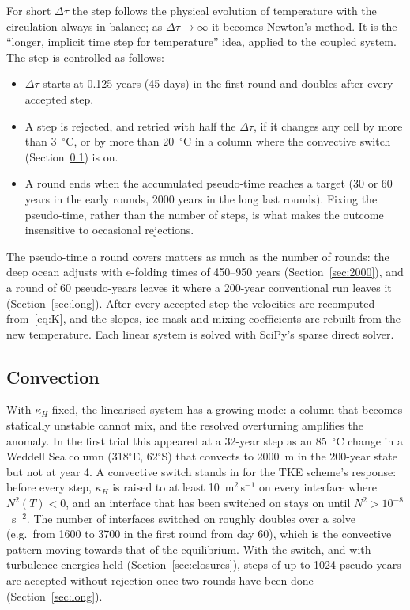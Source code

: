 \documentclass{article}
\begin{document}
For short $\Delta\tau$ the step follows the physical evolution of temperature with the circulation always in balance; as $\Delta\tau\to\infty$ it becomes Newton's method. It is the ``longer, implicit time step for temperature'' idea, applied to the coupled system. The step is controlled as follows:
\begin{itemize}
\item $\Delta\tau$ starts at 0.125 years (45 days) in the first round and doubles after every accepted step.
\item A step is rejected, and retried with half the $\Delta\tau$, if it changes any cell by more than 3~$^\circ$C, or by more than 20~$^\circ$C in a column where the convective switch (Section~\ref{sec:convection}) is on.
\item A round ends when the accumulated pseudo-time reaches a target (30 or 60 years in the early rounds, 2000 years in the long last rounds). Fixing the pseudo-time, rather than the number of steps, is what makes the outcome insensitive to occasional rejections.
\end{itemize}
The pseudo-time a round covers matters as much as the number of rounds: the deep ocean adjusts with e-folding times of 450--950 years (Section~\ref{sec:2000}), and a round of 60 pseudo-years leaves it where a 200-year conventional run leaves it (Section~\ref{sec:long}).
After every accepted step the velocities are recomputed from~\eqref{eq:K}, and the slopes, ice mask and mixing coefficients are rebuilt from the new temperature. Each linear system is solved with SciPy's sparse direct solver.

\subsection{Convection}\label{sec:convection}

With $\kappa_H$ fixed, the linearised system has a growing mode: a column that becomes statically unstable cannot mix, and the resolved overturning amplifies the anomaly. In the first trial this appeared at a 32-year step as an 85~$^\circ$C change in a Weddell Sea column (318$^\circ$E, 62$^\circ$S) that convects to 2000~m in the 200-year state but not at year 4. A convective switch stands in for the TKE scheme's response: before every step, $\kappa_H$ is raised to at least 10~m$^2$\,s$^{-1}$ on every interface where $N^2(T)<0$, and an interface that has been switched on stays on until $N^2>10^{-8}$~s$^{-2}$. The number of interfaces switched on roughly doubles over a solve (e.g.\ from 1600 to 3700 in the first round from day 60), which is the convective pattern moving towards that of the equilibrium. With the switch, and with turbulence energies held (Section~\ref{sec:closures}), steps of up to 1024 pseudo-years are accepted without rejection once two rounds have been done (Section~\ref{sec:long}).
\end{document}
